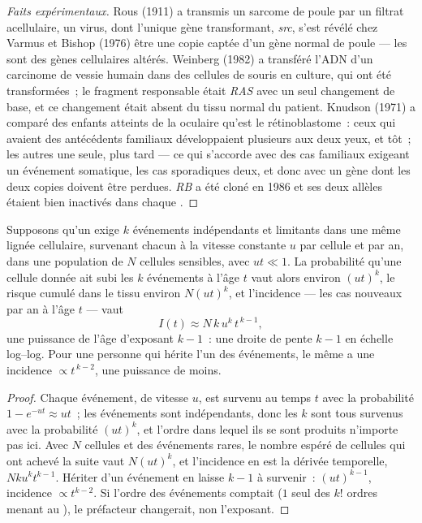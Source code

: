 \begin{proof}[Faits expérimentaux]
Rous (1911) a transmis un sarcome de poule par un filtrat acellulaire,
un virus, dont l'unique gène transformant, \emph{src}, s'est révélé
chez Varmus et Bishop (1976) être une copie captée d'un gène normal de
poule --- les  sont des gènes cellulaires altérés. Weinberg
(1982) a transféré l'ADN d'un carcinome de vessie humain dans des
cellules de souris en culture, qui ont été transformées~; le fragment
responsable était \emph{RAS} avec un seul changement de base, et ce
changement était absent du tissu normal du patient. Knudson (1971) a
comparé des enfants atteints de la  oculaire qu'est le
rétinoblastome~: ceux qui avaient des antécédents familiaux
développaient plusieurs  aux deux yeux, et tôt~; les autres une
seule, plus tard --- ce qui s'accorde avec des cas familiaux exigeant
un événement somatique, les cas sporadiques deux, et donc avec un gène
dont les deux copies doivent être perdues. \emph{RB} a été cloné en
1986 et ses deux allèles étaient bien inactivés dans chaque .
\end{proof}

\begin{theorem}\label{thm:b3:cancer-biology:armitage-doll}
Supposons qu'un  exige $k$ événements indépendants et limitants
dans une même lignée cellulaire, survenant chacun à la vitesse
constante $u$ par cellule et par an, dans une population de $N$
cellules sensibles, avec $ut \ll 1$. La probabilité qu'une cellule
donnée ait subi les $k$ événements à l'âge $t$ vaut alors environ
$(ut)^{k}$, le risque cumulé dans le tissu environ $N(ut)^{k}$, et
l'incidence --- les cas nouveaux par an à l'âge $t$ --- vaut
\[
I(t) \approx N\,k\,u^{k}\,t^{\,k-1},
\]
une puissance de l'âge d'exposant $k - 1$~: une droite de pente
$k - 1$ en échelle log--log. Pour une personne qui hérite l'un des
événements, le même  a une incidence $\propto t^{\,k-2}$, une
puissance de moins.
\end{theorem}
\begin{proof}
Chaque événement, de vitesse $u$, est survenu au temps $t$ avec la
probabilité $1 - e^{-ut} \approx ut$~; les événements sont
indépendants, donc les $k$ sont tous survenus avec la probabilité
$(ut)^{k}$, et l'ordre dans lequel ils se sont produits n'importe pas
ici. Avec $N$ cellules et des événements rares, le nombre espéré de
cellules qui ont achevé la suite vaut $N(ut)^{k}$, et l'incidence en est
la dérivée temporelle, $Nku^{k}t^{k-1}$. Hériter d'un événement en
laisse $k - 1$ à survenir~: $(ut)^{k-1}$, incidence
$\propto t^{k-2}$. Si l'ordre des événements comptait ($1$ seul des
$k!$ ordres menant au ), le préfacteur changerait, non
l'exposant.
\end{proof}

